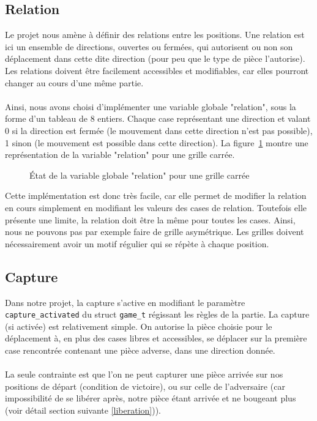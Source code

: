 \documentclass{article}
\begin{document}
\subsection{Relation}
Le projet nous amène à définir des relations entre les positions. Une relation est ici un ensemble de directions, ouvertes
ou fermées, qui autorisent ou non son déplacement dans cette dite direction (pour peu que le type de pièce l'autorise). Les relations
doivent être facilement accessibles et modifiables, car elles pourront changer au cours d'une même partie.
\\\\
Ainsi, nous avons choisi d'implémenter une variable globale "relation", sous la forme d'un tableau de 8 entiers. Chaque case représentant
une direction et valant 0 si la direction est fermée (le mouvement dans cette direction n'est pas possible), 1 sinon (le mouvement est possible
dans cette direction). La figure~\ref{carre} montre une représentation de la variable "relation" pour une grille carrée.

\begin{figure}[h]
    \centering
    \caption{État de la variable globale "relation" pour une grille carrée}
    \label{carre}
\end{figure}
Cette implémentation est donc très facile, car elle permet de modifier la relation en cours simplement en modifiant les valeurs des cases de relation.
Toutefois elle présente une limite, la relation doit être la même pour toutes les cases. Ainsi, nous ne pouvons pas par exemple faire de grille asymétrique.
Les grilles doivent nécessairement avoir un motif régulier qui se répète à chaque position.

\newpage
\subsection{Capture}
Dans notre projet, la capture s'active en modifiant le paramètre \lstinline{capture_activated} du struct \lstinline{game_t} régissant
les règles de la partie. La capture (si activée) est relativement simple. On autorise la pièce choisie pour le déplacement à, en plus des cases libres
et accessibles, se déplacer sur la première case rencontrée contenant une pièce adverse, dans une direction donnée.
\\\\
La seule contrainte est que l'on ne peut capturer une pièce arrivée sur nos positions de départ (condition de victoire), ou sur celle de l'adversaire (car impossibilité
de se libérer après, notre pièce étant arrivée et ne bougeant plus (voir détail section suivante \ref{liberation})).
\vspace{3cm}
\end{document}

